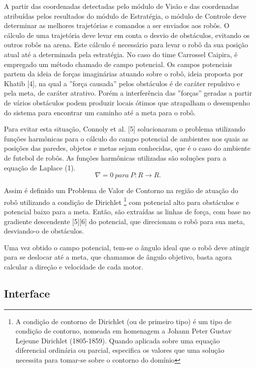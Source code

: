A partir das coordenadas detectadas pelo módulo de Visão e das coordenadas atribuídas pelos resultados do módulo de Estratégia, o módulo de Controle deve determinar as melhores trajetórias e comandos a ser enviados aos robôs. O cálculo de uma trajetória deve levar em conta o desvio de obstáculos, evitando os outros robôs na arena. Este cálculo é necessário para levar o robô da sua posição atual até a determinada pela estratégia. No caso do time Carrossel Caipira, é empregado um método chamado de campo potencial. Os campos potenciais partem da ideia de forças imaginárias atuando sobre o robô, ideia proposta por Khatib [4], na qual a ''força causada'' pelos obstáculos é de caráter repulsivo e pela meta, de caráter atrativo. Porém a interferência das ''forças'' geradas a partir de vários obstáculos podem produzir locais
ótimos que atrapalham o desempenho do sistema para encontrar um caminho até a meta para o robô.

Para evitar esta situação, Connoly et al. [5] solucionaram o problema utilizando funções harmônicas para o cálculo do campo potencial de ambientes nos quais as posições das paredes, objetos e metas sejam conhecidas, que é o caso do ambiente de futebol de robôs. As funções harmônicas utilizadas são soluções para a equação de Laplace (1).
%
\begin{equation}
\nabla = 0 \ para \ P : R \rightarrow R .
\end{equation}

Assim é definido um Problema de Valor de Contorno na região de atuação do robô utilizando a condição de Dirichlet%
%
\footnote{A condição de contorno de Dirichlet (ou de primeiro tipo) é um tipo de condição de contorno, nomeada em homenagem a Johann Peter Gustav Lejeune Dirichlet (1805-1859). Quando aplicada sobre uma equação diferencial ordinária ou parcial, especifica os valores que uma solução necessita para tomar-se sobre o contorno do domínio}
%
com potencial alto para obstáculos e potencial baixo para a meta. Então, são extraídas as linhas de força, com base no gradiente descendente [5][6] do potencial, que direcionam o robô para sua meta, desviando-o de obstáculos.

Uma vez obtido o campo potencial, tem-se o ângulo ideal que o robô deve atingir para se deslocar até a meta, que chamamos de ângulo objetivo, basta agora calcular a direção e velocidade de cada motor.

\subsection{Interface}

